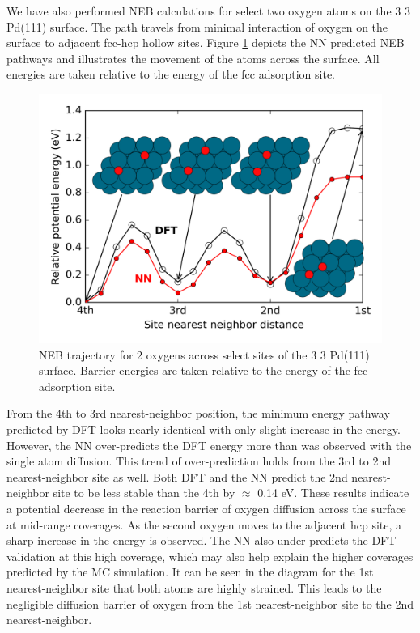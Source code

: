 \documentclass[12pt,oneside]{cmuthesis}
\begin{document}
We have also performed NEB calculations for select two oxygen atoms on the 3 \texttimes{} 3 Pd(111) surface. The path travels from minimal interaction of oxygen on the surface to adjacent fcc-hcp hollow sites. Figure \ref{fig-PdO2-NEB} depicts the NN predicted NEB pathways and illustrates the movement of the atoms across the surface.  All energies are taken relative to the energy of the fcc adsorption site.

\begin{figure}[htbp]
\centering
\includegraphics[width=5.5in]{./images/PdO2-NEB.png}
\caption{\label{fig-PdO2-NEB}
NEB trajectory for 2 oxygens across select sites of the 3 \texttimes{} 3 Pd(111) surface. Barrier energies are taken relative to the energy of the fcc adsorption site.}
\end{figure}

From the 4th to 3rd nearest-neighbor position, the minimum energy pathway predicted by DFT looks nearly identical with only slight increase in the energy. However, the NN over-predicts the DFT energy more than was observed with the single atom diffusion. This trend of over-prediction holds from the 3rd to 2nd nearest-neighbor site as well. Both DFT and the NN predict the 2nd nearest-neighbor site to be less stable than the 4th by \(\approx\) 0.14 eV. These results indicate a potential decrease in the reaction barrier of oxygen diffusion across the surface at mid-range coverages. As the second oxygen moves to the adjacent hcp site, a sharp increase in the energy is observed. The NN also under-predicts the DFT validation at this high coverage, which may also help explain the higher coverages predicted by the MC simulation. It can be seen in the diagram for the 1st nearest-neighbor site that both atoms are highly strained. This leads to the negligible diffusion barrier of oxygen from the 1st nearest-neighbor site to the 2nd nearest-neighbor.
\end{document}
